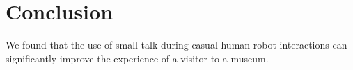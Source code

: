 \section{Conclusion}

We found that the use of small talk during casual human-robot interactions can significantly improve the experience of a visitor to a museum.
